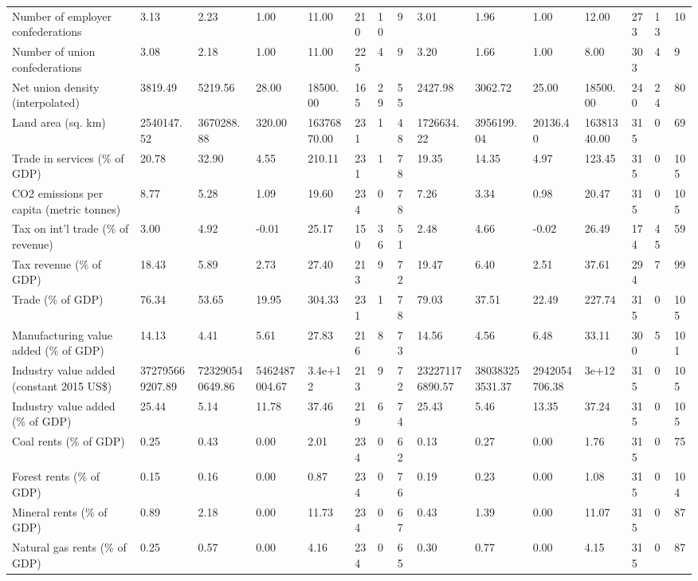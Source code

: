 \begin{longtable}{lllllllllllllll}
Number of employer confederations & 3.13 & 2.23 & 1.00 & 11.00 & 210 & 10 & 9 & 3.01 & 1.96 & 1.00 & 12.00 & 273 & 13 & 10\\
Number of union confederations & 3.08 & 2.18 & 1.00 & 11.00 & 225 & 4 & 9 & 3.20 & 1.66 & 1.00 & 8.00 & 303 & 4 & 9\\
Net union density (interpolated) & 3819.49 & 5219.56 & 28.00 & 18500.00 & 165 & 29 & 55 & 2427.98 & 3062.72 & 25.00 & 18500.00 & 240 & 24 & 80\\
Land area (sq. km) & 2540147.52 & 3670288.88 & 320.00 & 16376870.00 & 231 & 1 & 48 & 1726634.22 & 3956199.04 & 20136.40 & 16381340.00 & 315 & 0 & 69\\
\addlinespace
Trade in services (\% of GDP) & 20.78 & 32.90 & 4.55 & 210.11 & 231 & 1 & 78 & 19.35 & 14.35 & 4.97 & 123.45 & 315 & 0 & 105\\
CO2 emissions per capita (metric tonnes) & 8.77 & 5.28 & 1.09 & 19.60 & 234 & 0 & 78 & 7.26 & 3.34 & 0.98 & 20.47 & 315 & 0 & 105\\
Tax on int'l trade (\% of revenue) & 3.00 & 4.92 & -0.01 & 25.17 & 150 & 36 & 51 & 2.48 & 4.66 & -0.02 & 26.49 & 174 & 45 & 59\\
Tax revenue (\% of GDP) & 18.43 & 5.89 & 2.73 & 27.40 & 213 & 9 & 72 & 19.47 & 6.40 & 2.51 & 37.61 & 294 & 7 & 99\\
Trade (\% of GDP) & 76.34 & 53.65 & 19.95 & 304.33 & 231 & 1 & 78 & 79.03 & 37.51 & 22.49 & 227.74 & 315 & 0 & 105\\
\addlinespace
Manufacturing value added (\% of GDP) & 14.13 & 4.41 & 5.61 & 27.83 & 216 & 8 & 73 & 14.56 & 4.56 & 6.48 & 33.11 & 300 & 5 & 101\\
Industry value added (constant 2015 US\$) & 372795669207.89 & 723290540649.86 & 5462487004.67 & 3.4e+12 & 213 & 9 & 72 & 232271176890.57 & 380383253531.37 & 2942054706.38 & 3e+12 & 315 & 0 & 105\\
Industry value added (\% of GDP) & 25.44 & 5.14 & 11.78 & 37.46 & 219 & 6 & 74 & 25.43 & 5.46 & 13.35 & 37.24 & 315 & 0 & 105\\
Coal rents (\% of GDP) & 0.25 & 0.43 & 0.00 & 2.01 & 234 & 0 & 62 & 0.13 & 0.27 & 0.00 & 1.76 & 315 & 0 & 75\\
Forest rents (\% of GDP) & 0.15 & 0.16 & 0.00 & 0.87 & 234 & 0 & 76 & 0.19 & 0.23 & 0.00 & 1.08 & 315 & 0 & 104\\
\addlinespace
Mineral rents (\% of GDP) & 0.89 & 2.18 & 0.00 & 11.73 & 234 & 0 & 67 & 0.43 & 1.39 & 0.00 & 11.07 & 315 & 0 & 87\\
Natural gas rents (\% of GDP) & 0.25 & 0.57 & 0.00 & 4.16 & 234 & 0 & 65 & 0.30 & 0.77 & 0.00 & 4.15 & 315 & 0 & 87\\

\end{longtable}

